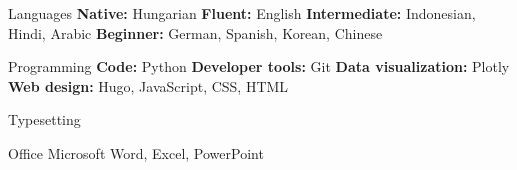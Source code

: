 
\begin{cvskills}

   
  \cvskill
    {Languages} %
    {\textbf{Native:} Hungarian \textbf{Fluent:} English \textbf{Intermediate:} Indonesian, Hindi, Arabic \textbf{Beginner:} German, Spanish, Korean, Chinese} %
    
  \cvskill
    {Programming} %
    {\textbf{Code:} Python \textbf{Developer tools:} Git \textbf{Data visualization:} Plotly \textbf{Web design:} Hugo, JavaScript, CSS, HTML} %

  \cvskill
    {Typesetting}
    {\textrm{}}

  \cvskill
    {Office}
    {Microsoft Word, Excel, PowerPoint}
 
\end{cvskills}
